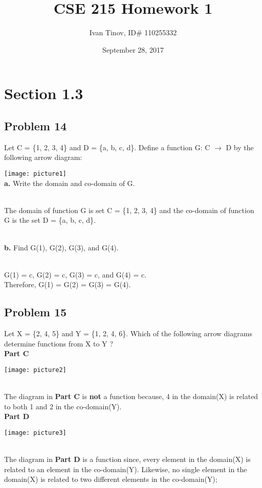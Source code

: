 \documentclass{article}
\title{CSE 215 Homework 1}
\author{Ivan Tinov, ID# 110255332}
\date{September 28, 2017}
\begin{document}
\maketitle
\parindent 

\section*{Section 1.3}
\subsection*{Problem 14}
Let C = \{1, 2, 3, 4\} and D = \{a, b, c, d\}. 
Define a function G: C $\rightarrow$ D by the following arrow diagram:

\texttt{[image: picture1]}
\\ \textbf{a.} Write the domain and co-domain of G.

\\ The domain of function G is set C = \{1, 2, 3, 4\} and the co-domain
of function G is the set D = \{a, b, c, d\}.

\\ \textbf{b.} Find G(1), G(2), G(3), and G(4).

\\ G(1) = c, G(2) = c, G(3) = c, and G(4) = c.
\\ Therefore, G(1) = G(2) = G(3) = G(4). 

\subsection*{Problem 15}
Let X = \{2, 4, 5\} and Y = \{1, 2, 4, 6\}. Which of the following
arrow diagrams determine functions from X to Y ?
\\ \textbf{Part C}

\texttt{[image: picture2]}

\\ The diagram in \textbf{Part C} is \textbf{not} a function because, 4 in the domain(X) is related to both 1 and 2 in the co-domain(Y).
\\ \textbf{Part D}

\texttt{[image: picture3]}

\\ The diagram in \textbf{Part D} is a function since, every element in the domain(X) is related to an element in the co-domain(Y). Likewise, no single element in the domain(X) is related to two different elements in the co-domain(Y);
\end{document}
